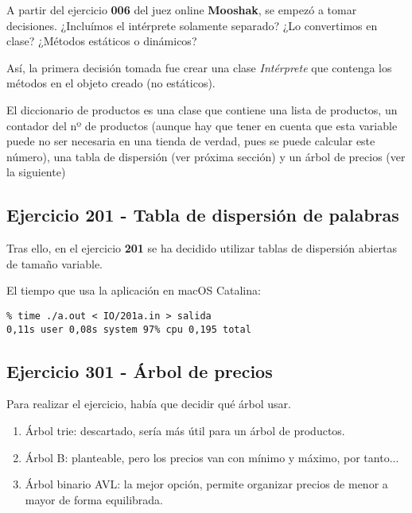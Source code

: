 \documentclass[
10pt, %
a4paper, %
oneside, %
headinclude,footinclude, %
BCOR5mm, %
]{scrartcl}
\begin{document}
A partir del ejercicio \textbf{006} del juez online \textbf{Mooshak}, se empezó a tomar decisiones. ¿Incluímos el intérprete solamente separado? ¿Lo convertimos en clase? ¿Métodos estáticos o dinámicos?

Así, la primera decisión tomada fue crear una clase \textit{Intérprete} que contenga los métodos en el objeto creado (no estáticos).

El diccionario de productos es una clase que contiene una lista de productos, un contador del nº de productos (aunque hay que tener en cuenta que esta variable puede no ser necesaria en una tienda de verdad, pues se puede calcular este número), una tabla de dispersión (ver próxima sección) y un árbol de precios (ver la siguiente)

\subsection{Ejercicio 201 - Tabla de dispersión de palabras}


Tras ello, en el ejercicio \textbf{201} se ha decidido utilizar tablas de dispersión abiertas de tamaño variable.

El tiempo que usa la aplicación en macOS Catalina:

\begin{lstlisting}
% time ./a.out < IO/201a.in > salida 
0,11s user 0,08s system 97% cpu 0,195 total
\end{lstlisting}



\subsection{Ejercicio 301 - Árbol de precios}

Para realizar el ejercicio, había que decidir qué árbol usar. 

\begin{enumerate}[noitemsep] %
\item Árbol trie: descartado, sería más útil para un árbol de productos.
\item Árbol B: planteable, pero los precios van con mínimo y máximo, por tanto...
\item Árbol binario AVL: la mejor opción, permite organizar precios de menor a mayor de forma equilibrada.
\end{enumerate}


\lipsum[6] %
\end{document}
